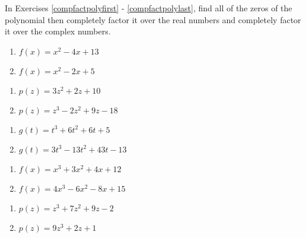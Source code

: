 \documentclass{ximera}
\begin{document}
	\author{Stitz-Zeager}


In Exercises \ref{compfactpolyfirst} - \ref{compfactpolylast}, find all of the zeros of the polynomial then completely factor it over the real numbers and completely factor it over the complex numbers.

\begin{multicols}{2}
\begin{enumerate}

\item $f(x) = x^{2} - 4x + 13$ \label{compfactpolyfirst}
\item $f(x) = x^2 - 2x + 5$

\setcounter{HW}{\value{enumi}}
\end{enumerate}
\end{multicols}

\begin{multicols}{2}
\begin{enumerate}
\setcounter{enumi}{\value{HW}}

\item $p(z) = 3z^{2} + 2z + 10$
\item $p(z) = z^3-2z^2+9z-18$

\setcounter{HW}{\value{enumi}}
\end{enumerate}
\end{multicols}

\begin{multicols}{2}
\begin{enumerate}
\setcounter{enumi}{\value{HW}}

\item $g(t) = t^{3} + 6t^{2} + 6t + 5$
\item $g(t) = 3t^{3} - 13t^{2} + 43t - 13$

\setcounter{HW}{\value{enumi}}
\end{enumerate}
\end{multicols}

\begin{multicols}{2}
\begin{enumerate}
\setcounter{enumi}{\value{HW}}

\item $f(x) = x^3 + 3x^2 + 4x + 12$
\item $f(x) = 4x^3-6x^2-8x+15$

\setcounter{HW}{\value{enumi}}
\end{enumerate}
\end{multicols}

\begin{multicols}{2}
\begin{enumerate}
\setcounter{enumi}{\value{HW}}


\item  $p(z) = z^3 + 7z^2+9z-2$
\item  $p(z) = 9z^3+2z+1$

\setcounter{HW}{\value{enumi}}
\end{enumerate}
\end{multicols}
\end{document}
